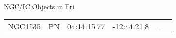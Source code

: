 \begin{block}{NGC/IC Objects in Eri}
  \centering
  \begin{tabularx}{\textwidth}{llrrll} 
    NGC1535 & PN & 04:14:15.77 & -12:44:21.8  & -- \\ 
  \end{tabularx}
\end{block}